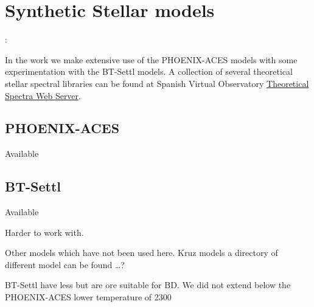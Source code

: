 
\section{Synthetic Stellar models}:

In the work we make extensive use of the {PHOENIX-ACES} models with some experimentation with the {BT-Settl} models.
A collection of several theoretical stellar spectral libraries can be found at Spanish Virtual Observatory \href{http://svo2.cab.inta-csic.es/theory/newov/index.php}{Theoretical Spectra Web Server}.



\subsection{PHOENIX-ACES}

Available 




\subsection{BT-Settl}

Available 

Harder to work with.

Other models which have not been used here. Kruz models a directory of different model can be found \ldots{}?

BT-Settl have less but are ore suitable for BD. We did not extend below the PHOENIX-ACES lower temperature of 2300\K{} 

